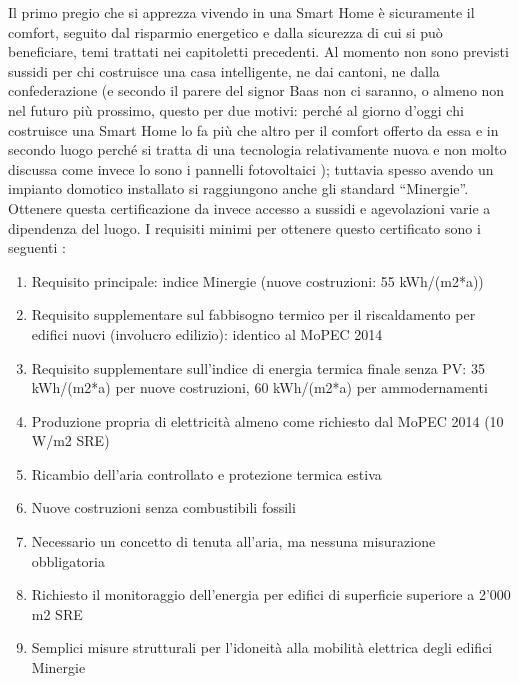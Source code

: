 Il primo pregio che si apprezza vivendo in una Smart Home è sicuramente il comfort, seguito dal risparmio energetico e dalla sicurezza di cui si può beneficiare, temi trattati nei capitoletti precedenti. Al momento non sono previsti sussidi per chi costruisce una casa intelligente, ne dai cantoni, ne dalla confederazione (e secondo il parere del signor Baas non ci saranno, o almeno non nel futuro più prossimo, questo per due motivi: perché al giorno d’oggi chi costruisce una Smart Home lo fa più che altro per il comfort offerto da essa e in secondo luogo perché si tratta di una tecnologia relativamente nuova e non molto discussa come invece lo sono i pannelli fotovoltaici ); tuttavia spesso avendo un impianto domotico installato si raggiungono anche gli standard “Minergie”. Ottenere questa certificazione da invece accesso a sussidi e agevolazioni varie a dipendenza del luogo. I requisiti minimi per ottenere questo certificato sono i seguenti :
\begin{enumerate}
\item  Requisito principale: indice Minergie (nuove costruzioni: 55 kWh/(m2*a))

\item  Requisito supplementare sul fabbisogno termico per il riscaldamento per edifici nuovi (involucro edilizio): identico al MoPEC 2014

\item  Requisito supplementare sull'indice di energia termica finale senza PV: 35 kWh/(m2*a) per nuove costruzioni, 60 kWh/(m2*a) per ammodernamenti

\item  Produzione propria di elettricità almeno come richiesto dal MoPEC 2014 (10 W/m2 SRE)

\item  Ricambio dell'aria controllato e protezione termica estiva

\item  Nuove costruzioni senza combustibili fossili 

\item  Necessario un concetto di tenuta all'aria, ma nessuna misurazione obbligatoria

\item  Richiesto il monitoraggio dell'energia per edifici di superficie superiore a 2'000 m2 SRE 

\item  Semplici misure strutturali per l'idoneità alla mobilità elettrica degli edifici Minergie
\end{enumerate}
